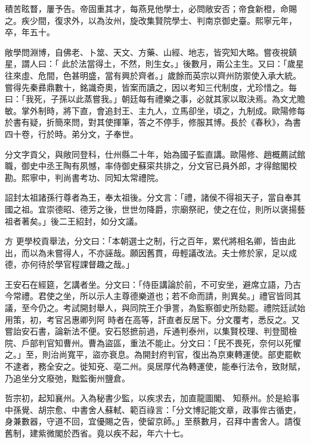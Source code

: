 \begin{pinyinscope}
 積苦眩瞀，屢予告。帝固重其才，每燕見他學士，必問敞安否；帝食新橙，命賜之。疾少間，復求外，以為汝州，旋改集賢院學士、判南京御史臺。熙寧元年，卒，年五十。



 敞學問淵博，自佛老、卜筮、天文、方藥、山經、地志，皆究知大略。嘗夜視鎮星，謂人曰：「
 此於法當得土，不然，則生女。」後數月，兩公主生。又曰：「歲星往來虛、危間，色甚明盛，當有興於齊者。」歲餘而英宗以齊州防禦使入承大統。嘗得先秦彞鼎數十，銘識奇奧，皆案而讀之，因以考知三代制度，尤珍惜之。每曰：「我死，子孫以此蒸嘗我。」朝廷每有禮樂之事，必就其家以取決焉。為文尤贍敏。掌外制時，將下直，會追封王、主九人，立馬卻坐，頃之，九制成。歐陽修每於書有疑，折簡來問，對其使揮筆，答之不停手，修服其博。長於《春秋》，為書
 四十卷，行於時。弟分文，子奉世。



 分文字貢父，與敞同登科，仕州縣二十年，始為國子監直講。歐陽修、趙概薦試館職，御史中丞王陶有夙憾，率侍御史蘇寀共排之，分文官已員外郎，才得館閣校勘。熙寧中，判尚書考功、同知太常禮院。



 詔封太祖諸孫行尊者為王，奉太祖後。分文言：「禮，諸侯不得祖天子，當自奉其國之祖。宜崇德昭、德芳之後，世世勿降爵，宗廟祭祀，使之在位，則所以褒揚藝祖者著矣。」後二王紹封，如分文議。



 方
 更學校貢舉法，分文曰：「本朝選士之制，行之百年，累代將相名卿，皆由此出，而以為未嘗得人，不亦誣哉。願因舊貫，毋輕議改法。夫士修於家，足以成德，亦何待於學官程課督趣之哉。」



 王安石在經筵，乞講者坐。分文曰：「侍臣講論於前，不可安坐，避席立語，乃古今常禮。君使之坐，所以示人主尊德樂道也；若不命而請，則異矣。」禮官皆同其議，至今仍之。考試開封舉人，與同院王介爭詈，為監察御史所劾罷。禮院廷試始用策，初，考官呂惠卿列阿
 時者在高等，訐直者反居下。分文覆考，悉反之。又嘗詒安石書，論新法不便。安石怒摭前過，斥通判泰州，以集賢校理、判登聞檢院、戶部判官知曹州。曹為盜區，重法不能止。分文曰：「民不畏死，奈何以死懼之。」至，則治尚寬平，盜亦衰息。為開封府判官，復出為京東轉運使。部吏罷軟不逮者，務全安之。徙知兗、亳二州。吳居厚代為轉運使，能奉行法令，致財賦，乃追坐分文廢弛，黜監衡州鹽倉。



 哲宗初，起知襄州。入為秘書少監，以疾求去，加直龍圖閣、
 知蔡州。於是給事中孫覺、胡宗愈、中書舍人蘇軾、範百祿言：「分文博記能文章，政事侔古循吏，身兼數器，守道不回，宜優賜之告，使留京師。」至蔡數月，召拜中書舍人。請復舊制，建紫微閣於西省。竟以疾不起，年六十七。




\end{pinyinscope}
